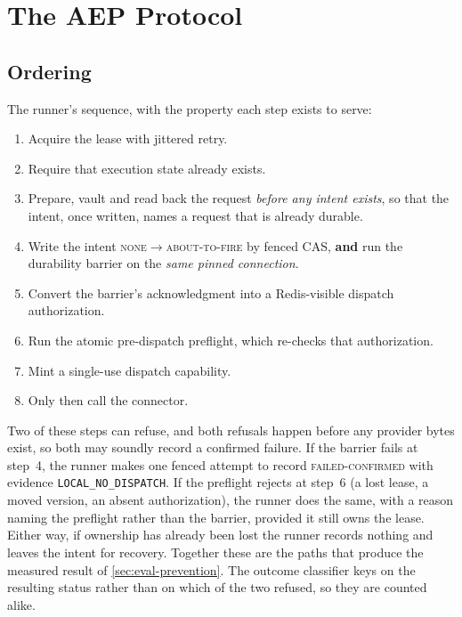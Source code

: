 \section{The AEP Protocol}
\label{sec:protocol}

\subsection{Ordering}

The runner's sequence, with the property each step exists to serve:

\begin{enumerate}
\item Acquire the lease with jittered retry.
\item Require that execution state already exists.
\item Prepare, vault and read back the request \emph{before any intent
      exists}, so that the intent, once written, names a request that is
      already durable.
\item Write the intent \textsc{none}$\rightarrow$\textsc{about-to-fire} by
      fenced CAS, \textbf{and} run the durability barrier on the \emph{same
      pinned connection}.
\item Convert the barrier's acknowledgment into a Redis-visible dispatch
      authorization.
\item Run the atomic pre-dispatch preflight, which re-checks that
      authorization.
\item Mint a single-use dispatch capability.
\item Only then call the connector.
\end{enumerate}

Two of these steps can refuse, and both refusals happen before any
provider bytes exist, so both may soundly record a confirmed failure. If the
barrier fails at step~4, the runner makes one fenced attempt to record
\textsc{failed-confirmed} with evidence \texttt{LOCAL\_NO\_DISPATCH}. If the
preflight rejects at step~6 (a lost lease, a moved version, an absent
authorization), the runner does the same, with a reason naming the preflight
rather than the barrier, provided it still owns the lease. Either way, if
ownership has already been lost the runner records nothing and leaves the
intent for recovery. Together these are the paths that produce the measured
result of \cref{sec:eval-prevention}. The outcome classifier keys on the
resulting status rather than on which of the two refused, so they are counted
alike.

